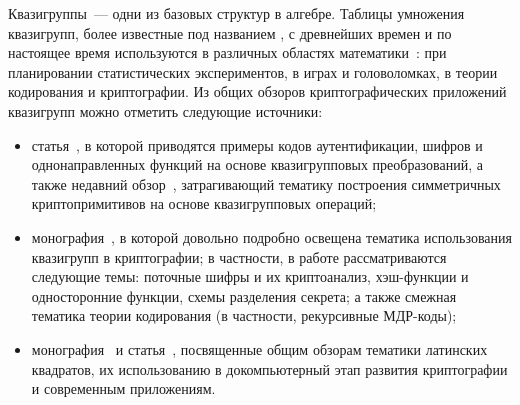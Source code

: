 {\actuality} 

    Квазигруппы~--- одни из базовых структур в алгебре.
    Таблицы умножения квазигрупп, более известные под названием , с древнейших времен и по настоящее время используются в различных областях математики~\cite{keedwell}: при планировании статистических экспериментов, в играх и головоломках, в теории кодирования и криптографии.
    Из общих обзоров криптографических приложений квазигрупп можно отметить следующие источники:
    \begin{itemize}
        \item статья~\cite{glukhov}, в которой приводятся примеры кодов аутентификации, шифров и однонаправленных функций на основе квазигрупповых преобразований, а также недавний обзор~\cite{chauhan2021quasigroups}, затрагивающий тематику построения симметричных криптопримитивов на основе квазигрупповых операций;
        \item монография~\cite{shcherbacov2017elements}, в которой довольно подробно освещена тематика использования квазигрупп в криптографии; в частности, в работе рассматриваются следующие темы: поточные шифры и их криптоанализ, хэш-функции и односторонние функции, схемы разделения секрета; а также смежная тематика теории кодирования (в частности, рекурсивные МДР-коды);
        \item монография~\cite{keedwell} и статья~\cite{tuzhilin2012}, посвященные общим обзорам тематики латинских квадратов, их использованию в докомпьютерный этап развития криптографии и современным приложениям.
    \end{itemize}

